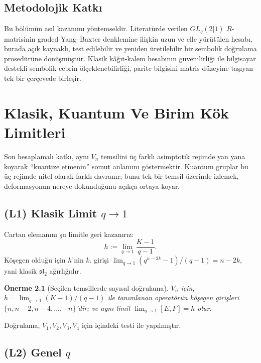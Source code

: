 \documentclass[12pt,a4paper,fleqn]{report}
\newcommand{\normalsemi}{;}
\newcommand{\normalsemi}{\begingroup\semicolonfont;\endgroup}
\numberwithin{equation}{chapter}
\theoremstyle{plain}
\newtheorem{proposition}[theorem]{Önerme}
\theoremstyle{definition}
\renewcommand{\sl}{\mathfrak{sl}}
\begin{document}
\section{Metodolojik Katkı}

Bu bölümün asıl kazanımı yöntemseldir. Literatürde verilen $GL_q(2|1)$
$R$-matrisinin graded Yang--Baxter denklemine ilişkin uzun ve elle yürütülen
hesabı, burada açık kaynaklı, test edilebilir ve yeniden üretilebilir bir
sembolik doğrulama prosedürüne dönüşmüştür. Klasik kâğıt-kalem hesabının
güvenilirliği ile bilgisayar destekli sembolik cebrin ölçeklenebilirliği,
parite bilgisini matris düzeyine taşıyan tek bir çerçevede birleşir.

\chapter{Klasik, Kuantum Ve Birim Kök Limitleri}\label{sec:limits}

Son hesaplamalı katkı, aynı $V_n$ temsilini üç farklı asimptotik rejimde yan
yana koyarak ``kuantize etmenin'' somut anlamını göstermektir. Kuantum gruplar
bu üç rejimde nitel olarak farklı davranır\normalsemi{} bunu tek bir temsil üzerinde
izlemek, deformasyonun nereye dokunduğunu açıkça ortaya koyar.

\section{(L1) Klasik Limit $q \to 1$}

Cartan elemanını şu limitle geri kazanırız:
\begin{equation}
  h := \lim_{q \to 1} \frac{K - 1}{q - 1}.
\end{equation}
Köşegen olduğu için $h$'nin $k$. girişi
$\lim_{q \to 1} (q^{n-2k} - 1)/(q - 1) = n - 2k$, yani klasik
$\sl_2$ ağırlığıdır.

\begin{proposition}[Seçilen temsillerde sayısal doğrulama]\label{thm:classical}
$V_n$ için, $h = \lim_{q\to 1} (K-1)/(q-1)$ ile tanımlanan operatörün
köşegen girişleri $\{n, n-2, n-4, \dots, -n\}$'dir\normalsemi{} ve aynı limit
$\lim_{q\to 1} [E,F] = h$ olur.
\end{proposition}

Doğrulama, $V_1, V_2, V_3, V_4$ için 
içindeki  testi ile
yapılmıştır.

\section{(L2) Genel $q$}
\end{document}
